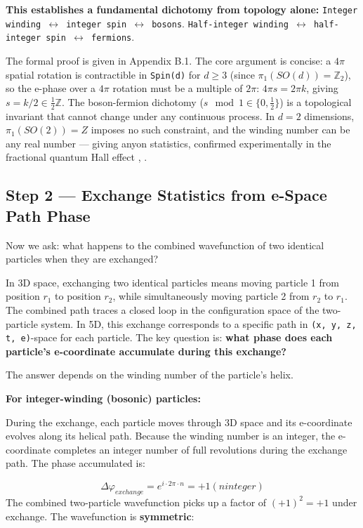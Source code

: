\documentclass[aps,prd,preprint,superscriptaddress,longbibliography,floatfix]{revtex4-2}
\theoremstyle{remark}
\begin{document}
\textbf{This establishes a fundamental dichotomy from topology alone:} \texttt{Integer winding $\leftrightarrow$ integer spin $\leftrightarrow$ bosons}. \texttt{Half-integer winding $\leftrightarrow$ half-integer spin $\leftrightarrow$ fermions}.

The formal proof is given in Appendix B.1. The core argument is concise: a $4\pi$ spatial rotation is contractible in \texttt{Spin(d)} for $d \geq 3$ (since $\pi_{1}(SO(d)) = \mathbb{Z}_{2}$), so the e-phase over a $4\pi$ rotation must be a multiple of $2\pi$: $4\pi s = 2\pi k$, giving $s = k/2 \in \tfrac{1}{2}\mathbb{Z}$. The boson-fermion dichotomy ($s \mod 1 \in \{0, \tfrac{1}{2}\}$) is a topological invariant that cannot change under any continuous process. In $d = 2$ dimensions, $\pi_{1}(SO(2)) = Z$ imposes no such constraint, and the winding number can be any real number --- giving anyon statistics, confirmed experimentally in the fractional quantum Hall effect \cite{Bartolomeietal2020}, \cite{Nakamuraetal2020}.



\subsection{Step 2 --- Exchange Statistics from e-Space Path Phase}

Now we ask: what happens to the combined wavefunction of two identical particles when they are exchanged?

In 3D space, exchanging two identical particles means moving particle 1 from position $r_{1}$ to position $r_{2}$, while simultaneously moving particle 2 from $r_{2}$ to $r_{1}$. The combined path traces a closed loop in the configuration space of the two-particle system.
In 5D, this exchange corresponds to a specific path in \texttt{(x, y, z, t, e)}-space for each particle. The key question is: \textbf{what phase does each particle's e-coordinate accumulate during this exchange?}

The answer depends on the winding number of the particle's helix.

\textbf{For integer-winding (bosonic) particles:}

During the exchange, each particle moves through 3D space and its e-coordinate evolves along its helical path. Because the winding number is an integer, the e-coordinate completes an integer number of full revolutions during the exchange path. The phase accumulated is:


\begin{equation}
    \Delta\varphi_{exchange} = e^{i \cdot 2\pi \cdot n} = +1     (n integer)
\end{equation}
The combined two-particle wavefunction picks up a factor of $(+1)^{2} = +1$ under exchange. The wavefunction is \textbf{symmetric}:
\end{document}
